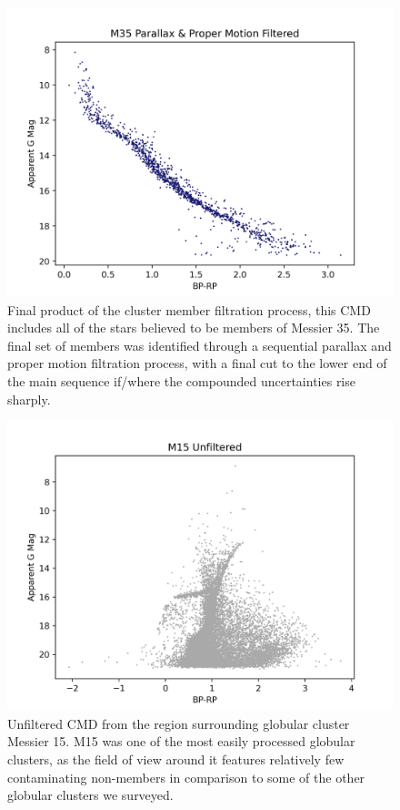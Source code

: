 \documentclass[onecolumn,table,xcdraw,super]{aastex631}
\begin{document}
\begin{figure}[]
    \centering
      \includegraphics[width=4.75in]{figures/M35_cmd_filtered.png}
    \caption{Final product of the cluster member filtration process, this CMD includes all of the stars believed to be members of Messier 35. The final set of members was identified through a sequential parallax and proper motion filtration process, with a final cut to the lower end of the main sequence if/where the compounded uncertainties rise sharply.}
    \label{fig:M35_cmd_filtered}
\end{figure}

\begin{figure}[]
    \centering
      \includegraphics[width=4.75in]{figures/M15_cmd_unfiltered.png}
    \caption{Unfiltered CMD from the region surrounding globular cluster Messier 15. M15 was one of the most easily processed globular clusters, as the field of view around it features relatively few contaminating non-members in comparison to some of the other globular clusters we surveyed.}
    \label{fig:M15_cmd_unfiltered}
\end{figure}
\end{document}
